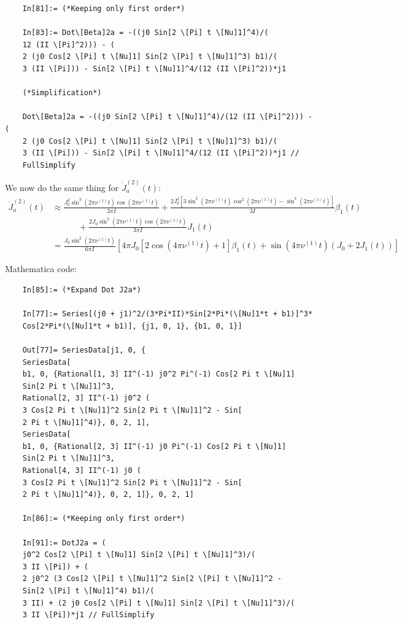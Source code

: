 \documentclass{article}
\theoremstyle{definition}
\newcommand{\be}{\beta}
\newcommand{\f}[2]{\frac{#1}{#2}}
\newcommand{\lb}{\left[}
\newcommand{\rb}{\right]}
\begin{document}
\begin{enumerate}[label=(\alph*)]
\begin{lstlisting}
	In[81]:= (*Keeping only first order*)
	
	In[83]:= Dot\[Beta]2a = -((j0 Sin[2 \[Pi] t \[Nu]1]^4)/(
	12 (II \[Pi]^2))) - (
	2 (j0 Cos[2 \[Pi] t \[Nu]1] Sin[2 \[Pi] t \[Nu]1]^3) b1)/(
	3 (II \[Pi])) - Sin[2 \[Pi] t \[Nu]1]^4/(12 (II \[Pi]^2))*j1
	
	(*Simplification*)
	
	Dot\[Beta]2a = -((j0 Sin[2 \[Pi] t \[Nu]1]^4)/(12 (II \[Pi]^2))) - (
	2 (j0 Cos[2 \[Pi] t \[Nu]1] Sin[2 \[Pi] t \[Nu]1]^3) b1)/(
	3 (II \[Pi])) - Sin[2 \[Pi] t \[Nu]1]^4/(12 (II \[Pi]^2))*j1 // 
	FullSimplify
	\end{lstlisting}
	
	
	We now do the same thing for $\dot J_a^{(2)}(t)$:
	\begin{align*}
	\dot J_a^{(2)}(t) &\approx \frac{J_0^2 \sin ^3(2 \pi \nu^{(1)} t) \cos (2 \pi \nu^{(1)} t)}{3 \pi I} +
	\frac{2  J_0^2 \lb 3 \sin ^2(2 \pi \nu^{(1)} t) \cos ^2(2 \pi 
	\nu^{(1)} t)-\sin ^4(2 \pi \nu^{(1)} t)\rb}{3I} \be_1(t)\\
	&\quad\quad\quad+\frac{2 J_0\sin ^3(2 \pi  \nu^{(1)} t) \cos (2 \pi  \nu^{(1)} t)}{3 \pi I}  J_1(t) \\
	&= \f{J_0 \sin ^2(2 \pi  \nu^{(1)} t)}{6\pi I}\lb  4 \pi   J_0 \lb 2 \cos (4
		\pi  \nu^{(1)} t)+1\rb   \be_1(t) + \sin (4 \pi \nu^{(1)}t) (J_0+2 J_1(t))\rb
	\end{align*}
	
	Mathematica code:
	\begin{lstlisting}
	In[85]:= (*Expand Dot J2a*)
	
	In[77]:= Series[(j0 + j1)^2/(3*Pi*II)*Sin[2*Pi*(\[Nu]1*t + b1)]^3*
	Cos[2*Pi*(\[Nu]1*t + b1)], {j1, 0, 1}, {b1, 0, 1}]
	
	Out[77]= SeriesData[j1, 0, {
	SeriesData[
	b1, 0, {Rational[1, 3] II^(-1) j0^2 Pi^(-1) Cos[2 Pi t \[Nu]1]
	Sin[2 Pi t \[Nu]1]^3, 
	Rational[2, 3] II^(-1) j0^2 (
	3 Cos[2 Pi t \[Nu]1]^2 Sin[2 Pi t \[Nu]1]^2 - Sin[
	2 Pi t \[Nu]1]^4)}, 0, 2, 1], 
	SeriesData[
	b1, 0, {Rational[2, 3] II^(-1) j0 Pi^(-1) Cos[2 Pi t \[Nu]1]
	Sin[2 Pi t \[Nu]1]^3, 
	Rational[4, 3] II^(-1) j0 (
	3 Cos[2 Pi t \[Nu]1]^2 Sin[2 Pi t \[Nu]1]^2 - Sin[
	2 Pi t \[Nu]1]^4)}, 0, 2, 1]}, 0, 2, 1]
	
	In[86]:= (*Keeping only first order*)
	
	In[91]:= DotJ2a = (
	j0^2 Cos[2 \[Pi] t \[Nu]1] Sin[2 \[Pi] t \[Nu]1]^3)/(
	3 II \[Pi]) + (
	2 j0^2 (3 Cos[2 \[Pi] t \[Nu]1]^2 Sin[2 \[Pi] t \[Nu]1]^2 - 
	Sin[2 \[Pi] t \[Nu]1]^4) b1)/(
	3 II) + (2 j0 Cos[2 \[Pi] t \[Nu]1] Sin[2 \[Pi] t \[Nu]1]^3)/(
	3 II \[Pi])*j1 // FullSimplify
	

\end{lstlisting}
\end{enumerate}
\end{document}
